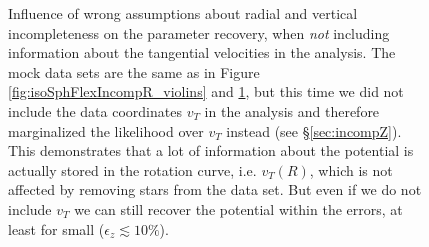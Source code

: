 \begin{figure}
\begin{minipage}{.48\textwidth}
\label{fig:isoSphFlexIncompZ_violins}
\end{minipage}
\end{figure}


\begin{figure}
\caption{Influence of wrong assumptions about radial and vertical incompleteness on the parameter recovery, when \emph{not} including information about the tangential velocities in the analysis. The mock data sets are the same as in Figure \ref{fig:isoSphFlexIncompR_violins} and \ref{fig:isoSphFlexIncompZ_violins}, but this time we did not include the data coordinates $v_T$ in the analysis and therefore marginalized the likelihood over $v_T$ instead (see \S\ref{sec:incompZ}). This demonstrates that a lot of information about the potential is actually stored in the rotation curve, i.e. $v_T(R)$, which is not affected by removing stars from the data set. But even if we do not include $v_T$ we can still recover the potential within the errors, at least for small ($\epsilon_z \lesssim 10\%$).} 
\label{fig:isoSphFlexIncomp_marginal_violins}
\end{figure}

